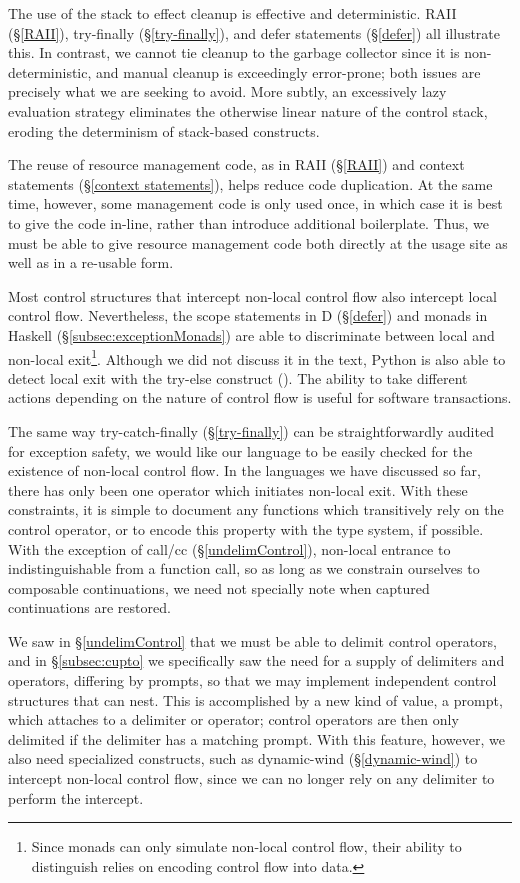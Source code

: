 \documentclass[11pt]{article}
\begin{document}
The use of the stack to effect cleanup is effective and deterministic.
RAII (\S\ref{RAII}), try-finally (\S\ref{try-finally}), and defer statements (\S\ref{defer}) all illustrate this.
In contrast, we cannot tie cleanup to the garbage collector since it is non-deterministic, and manual cleanup is exceedingly error-prone;
both issues are precisely what we are seeking to avoid.
More subtly, an excessively lazy evaluation strategy eliminates the otherwise linear nature of the control stack, eroding the determinism of stack-based constructs.

The reuse of resource management code, as in RAII (\S\ref{RAII}) and context statements (\S\ref{context statements}), helps reduce code duplication.
At the same time, however, some management code is only used once, in which case it is best to give the code in-line, rather than introduce additional boilerplate.
Thus, we must be able to give resource management code both directly at the usage site as well as in a re-usable form.

\newpage %
Most control structures that intercept non-local control flow also intercept local control flow.
Nevertheless, the scope statements in D (\S\ref{defer}) and monads in Haskell (\S\ref{subsec:exceptionMonads}) are able to discriminate between local and non-local exit\footnote{Since monads can only simulate non-local control flow, their ability to distinguish relies on encoding control flow into data.}.
Although we did not discuss it in the text, Python is also able to detect local exit with the try-else construct (\cite{pythonDocs}).
The ability to take different actions depending on the nature of control flow is useful for software transactions.

The same way try-catch-finally (\S\ref{try-finally}) can be straightforwardly audited for exception safety, we would like our language to be easily checked for the existence of non-local control flow.
In the languages we have discussed so far, there has only been one operator which initiates non-local exit.
With these constraints, it is simple to document any functions which transitively rely on the control operator, or to encode this property with the type system, if possible.
With the exception of call/cc (\S\ref{undelimControl}), non-local entrance to indistinguishable from a function call, so as long as we constrain ourselves to composable continuations, we need not specially note when captured continuations are restored.

We saw in \S\ref{undelimControl} that we must be able to delimit control operators, and in \S\ref{subsec:cupto} we specifically saw the need for a supply of delimiters and operators, differing by prompts, so that we may implement independent control structures that can nest.
This is accomplished by a new kind of value, a prompt, which attaches to a delimiter or operator; control operators are then only delimited if the delimiter has a matching prompt.
With this feature, however, we also need specialized constructs, such as dynamic-wind (\S\ref{dynamic-wind}) to intercept non-local control flow, since we can no longer rely on any delimiter to perform the intercept.
\end{document}

